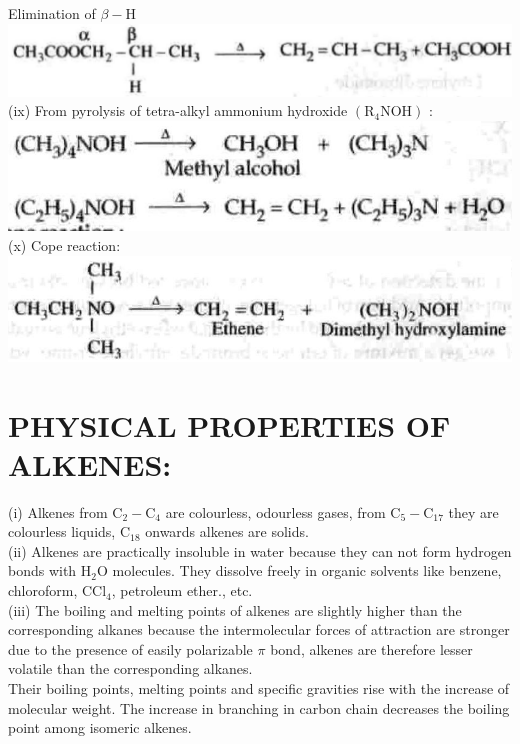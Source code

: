 \documentclass[10pt]{article}
\begin{document}
Elimination of $\beta-\mathrm{H}$\\
\includegraphics[max width=\textwidth, center]{2025_01_28_8470952b98110cec3aabg-179(4)}\\
(ix) From pyrolysis of tetra-alkyl ammonium hydroxide $\left(\mathrm{R}_{4} \mathrm{NOH}\right)$ :\\
\includegraphics[max width=\textwidth, center]{2025_01_28_8470952b98110cec3aabg-179(1)}\\
(x) Cope reaction:\\
\includegraphics[max width=\textwidth, center]{2025_01_28_8470952b98110cec3aabg-179(3)}

\section*{PHYSICAL PROPERTIES OF ALKENES:}
(i) Alkenes from $\mathrm{C}_{2}-\mathrm{C}_{4}$ are colourless, odourless gases, from $\mathrm{C}_{5}-\mathrm{C}_{17}$ they are colourless liquids, $\mathrm{C}_{18}$ onwards alkenes are solids.\\
(ii) Alkenes are practically insoluble in water because they can not form hydrogen bonds with $\mathrm{H}_{2} \mathrm{O}$ molecules. They dissolve freely in organic solvents like benzene, chloroform, $\mathrm{CCl}_{4}$, petroleum ether., etc.\\
(iii) The boiling and melting points of alkenes are slightly higher than the corresponding alkanes because the intermolecular forces of attraction are stronger due to the presence of easily polarizable $\pi$ bond, alkenes are therefore lesser volatile than the corresponding alkanes.\\
Their boiling points, melting points and specific gravities rise with the increase of molecular weight. The increase in branching in carbon chain decreases the boiling point among isomeric alkenes.
\end{document}
